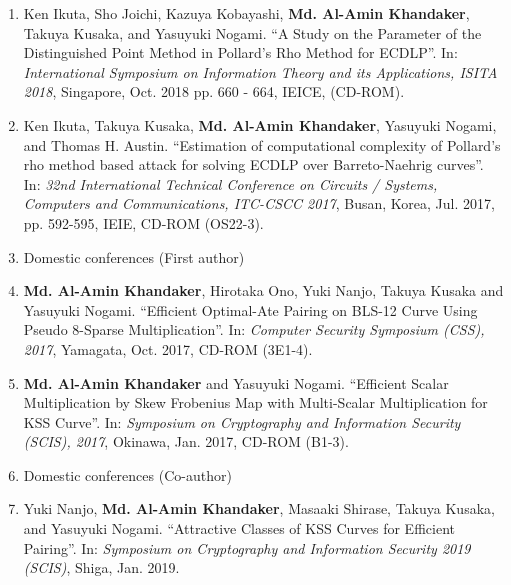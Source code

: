\begin{enumerate}
	\item Ken Ikuta, Sho Joichi, Kazuya Kobayashi, \textbf{Md. Al-Amin Khandaker}, Takuya Kusaka, and Yasuyuki Nogami. ``A Study on the Parameter of the Distinguished Point Method in Pollard's Rho Method for ECDLP''. In: \textit{International Symposium on Information Theory and its Applications, ISITA 2018},  Singapore, Oct. 2018 pp. 660 - 664,  IEICE, (CD-ROM).
	
	\item Ken Ikuta, Takuya Kusaka, \textbf{Md. Al-Amin Khandaker}, Yasuyuki Nogami, and Thomas H. Austin. ``Estimation of computational complexity of Pollard's rho method based attack for solving ECDLP over Barreto-Naehrig curves''. In: \textit{32nd International Technical Conference on Circuits / Systems, Computers and Communications, ITC-CSCC 2017},  Busan, Korea, Jul. 2017, pp. 592-595, IEIE, CD-ROM (OS22-3).
	\vspace{10mm}
	\large
	\item [] \Large Domestic conferences (First author)
	\normalsize
	
	\item \textbf{Md. Al-Amin Khandaker}, Hirotaka Ono, Yuki Nanjo, Takuya Kusaka and Yasuyuki Nogami. ``Efficient Optimal-Ate Pairing on BLS-12 Curve Using Pseudo 8-Sparse Multiplication''. In: \textit{Computer Security Symposium  (CSS),  2017}, Yamagata, Oct. 2017, CD-ROM (3E1-4). 
	
	\item \textbf{Md. Al-Amin Khandaker} and Yasuyuki Nogami. ``Efficient Scalar Multiplication by Skew Frobenius Map with Multi-Scalar Multiplication for KSS Curve''. In: \textit{Symposium on Cryptography and Information Security (SCIS),  2017}, Okinawa, Jan. 2017, CD-ROM (B1-3). 
	
	\vspace{10mm}
	\large
	\item[] \Large Domestic conferences (Co-author)
	\normalsize
			\item Yuki Nanjo, \textbf{Md. Al-Amin Khandaker}, Masaaki Shirase, Takuya Kusaka, and Yasuyuki Nogami.
		``Attractive Classes of KSS Curves for Efficient Pairing''.
		In: {\it Symposium on Cryptography and Information Security 2019 (SCIS)}, Shiga, Jan. 2019.
	

\end{enumerate}

